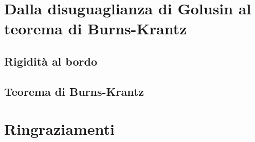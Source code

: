 \documentclass{article}
\begin{document}
\newpage

\section{Dalla disuguaglianza di Golusin al teorema di Burns-Krantz}

\subsection{Rigidità al bordo}


\subsection{Teorema di Burns-Krantz}


\newpage



\section*{Ringraziamenti}

\end{document}

